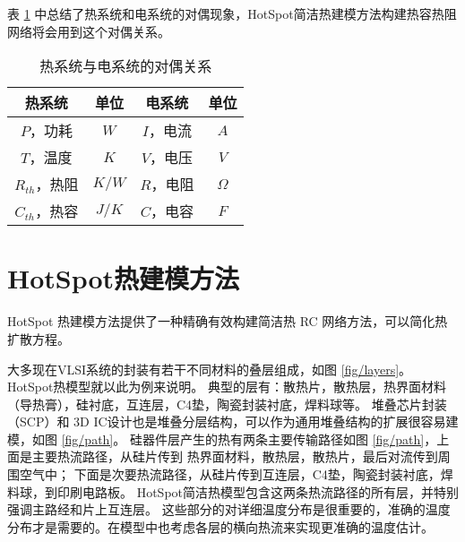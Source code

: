 表 \ref{tab:duality} 中总结了热系统和电系统的对偶现象，HotSpot简洁热建模方法构建热容热阻网络将会用到这个对偶关系。

\begin{table}[H]
\centering
\caption{热系统与电系统的对偶关系}\label{tab:duality}{
 \begin{tabular}{|c|c||c|c|}
 \hline
 \hline
 热系统 &  单位 & 电系统 & 单位 \\
 \hline 
 \hline
 $P$，功耗         & $W$   & $I$，电流 & $A$  \\
 \hline
 $T$，温度         & $K$   & $V$，电压 & $V$ \\
 \hline
 $R_{th}$，热阻    & $K/W$ & $R$，电阻 & $\Omega$ \\
 \hline
 $C_{th}$，热容    & $J/K$ & $C$，电容 & $F$ \\
 \hline
 \hline
 \end{tabular}
 }
 \end{table}
\section{HotSpot热建模方法}\label{sec:hotspot}

HotSpot 热建模方法提供了一种精确有效构建简洁热 RC 网络方法，可以简化热扩散方程。

大多现在VLSI系统的封装有若干不同材料的叠层组成，如图 \ref{fig/layers}。
HotSpot热模型就以此为例来说明。
典型的层有：散热片，散热层，热界面材料（导热膏），硅衬底，互连层，C4垫，陶瓷封装衬底，焊料球等。
堆叠芯片封装（SCP）和 3D IC设计也是堆叠分层结构，可以作为通用堆叠结构的扩展很容易建模，如图 \ref{fig/path}。
硅器件层产生的热有两条主要传输路径如图 \ref{fig/path}，上面是主要热流路径，从硅片传到 热界面材料，散热层，散热片，最后对流传到周围空气中；
下面是次要热流路径，从硅片传到互连层，C4垫，陶瓷封装衬底，焊料球，到印刷电路板。
HotSpot简洁热模型包含这两条热流路径的所有层，并特别强调主路经和片上互连层。
这些部分的对详细温度分布是很重要的，准确的温度分布才是需要的。在模型中也考虑各层的横向热流来实现更准确的温度估计。




